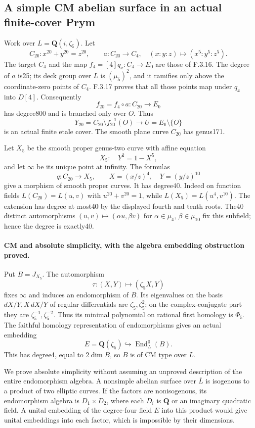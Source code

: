 \subsection*{A simple CM abelian surface in an actual finite-cover Prym}

Work over $L=\mathbf Q(i,\zeta_5)$. Let
\[
 C_{20}:x^{20}+y^{20}=z^{20},\qquad
 a:C_{20}\longrightarrow C_4,\quad(x:y:z)\longmapsto(x^5:y^5:z^5).
\]
The target $C_4$ and the map $f_4=[4]q_x:C_4\to E_0$ are those of
F.3.16. The degree of $a$ is25; its deck group over $L$ is
$(\mu_5)^2$, and it ramifies only above the coordinate-zero points of
$C_4$. F.3.17 proves that all those points map under $q_x$ into $D[4]$.
Consequently
\[
 f_{20}=f_4\circ a:C_{20}\to E_0
\]
has degree800 and is branched only over $O$. Thus
\[
 Y_{20}=C_{20}\setminus f_{20}^{-1}(O)\longrightarrow
 U=E_0\setminus\{O\}
\]
is an actual finite etale cover. The smooth plane curve $C_{20}$ has
genus171.

Let $X_5$ be the smooth proper genus-two curve with affine equation
\[
 X_5:\quad Y^2=1-X^5,
\]
and let $\infty$ be its unique point at infinity. The formulas
\[
 q:C_{20}\longrightarrow X_5,\qquad
 X=(x/z)^4,\quad Y=(y/z)^{10}
\]
give a morphism of smooth proper curves. It has degree40. Indeed on
function fields $L(C_{20})=L(u,v)$ with $u^{20}+v^{20}=1$, while
$L(X_5)=L(u^4,v^{10})$. The extension has degree at most40 by the
displayed fourth and tenth roots. The40 distinct automorphisms
$(u,v)\mapsto(\alpha u,\beta v)$ for
$\alpha\in\mu_4$, $\beta\in\mu_{10}$ fix this subfield; hence the
degree is exactly40.

\paragraph{CM and absolute simplicity, with the algebra embedding obstruction proved.}
Put $B=J_{X_5}$. The automorphism
\[
 \tau:(X,Y)\longmapsto(\zeta_5X,Y)
\]
fixes $\infty$ and induces an endomorphism of $B$. Its eigenvalues on
the basis $dX/Y,X\,dX/Y$ of regular differentials are
$\zeta_5,\zeta_5^2$; on the complex-conjugate part they are
$\zeta_5^{-1},\zeta_5^{-2}$. Thus its minimal polynomial on rational
first homology is $\Phi_5$. The faithful homology representation of
endomorphisms gives an actual embedding
\[
 E=\mathbf Q(\zeta_5)\hookrightarrow\operatorname{End}^0_L(B).
\]
This has degree4, equal to $2\dim B$, so $B$ is of CM type over $L$.

We prove absolute simplicity without assuming an unproved description
of the entire endomorphism algebra. A nonsimple abelian surface over
$\overline L$ is isogenous to a product of two elliptic curves.
If the factors are nonisogenous, its endomorphism algebra is
$D_1\times D_2$, where each $D_i$ is $\mathbf Q$ or an imaginary
quadratic field. A unital embedding of the degree-four field $E$ into
this product would give unital embeddings into each factor, which is
impossible by their dimensions.

